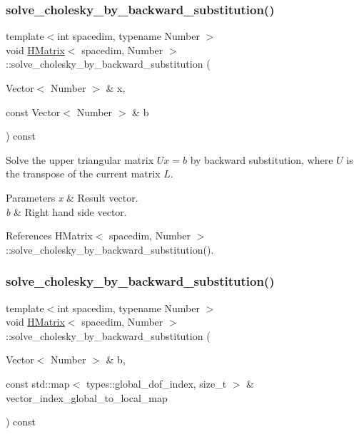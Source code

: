 \subsubsection{\texorpdfstring{solve\+\_\+cholesky\+\_\+by\+\_\+backward\+\_\+substitution()}{solve\_cholesky\_by\_backward\_substitution()}\hspace{0.1cm}{\footnotesize\ttfamily [2/4]}}
{\footnotesize\ttfamily template$<$int spacedim, typename Number $>$ \\
void \hyperlink{classHMatrix}{H\+Matrix}$<$ spacedim, Number $>$\+::solve\+\_\+cholesky\+\_\+by\+\_\+backward\+\_\+substitution (\begin{DoxyParamCaption}\item[{Vector$<$ Number $>$ \&}]{x,  }\item[{const Vector$<$ Number $>$ \&}]{b }\end{DoxyParamCaption}) const}

Solve the upper triangular matrix $Ux=b$ by backward substitution, where $U$ is the transpose of the current matrix $L$.


\begin{DoxyParams}{Parameters}
{\em x} & Result vector. \\
\hline
{\em b} & Right hand side vector. \\
\hline
\end{DoxyParams}


References H\+Matrix$<$ spacedim, Number $>$\+::solve\+\_\+cholesky\+\_\+by\+\_\+backward\+\_\+substitution().

\mbox{\label{classHMatrix_ae8bbf6f35a2099872fbcbfda2cb1abbd}} 
\subsubsection{\texorpdfstring{solve\+\_\+cholesky\+\_\+by\+\_\+backward\+\_\+substitution()}{solve\_cholesky\_by\_backward\_substitution()}\hspace{0.1cm}{\footnotesize\ttfamily [3/4]}}
{\footnotesize\ttfamily template$<$int spacedim, typename Number $>$ \\
void \hyperlink{classHMatrix}{H\+Matrix}$<$ spacedim, Number $>$\+::solve\+\_\+cholesky\+\_\+by\+\_\+backward\+\_\+substitution (\begin{DoxyParamCaption}\item[{Vector$<$ Number $>$ \&}]{b,  }\item[{const std\+::map$<$ types\+::global\+\_\+dof\+\_\+index, size\+\_\+t $>$ \&}]{vector\+\_\+index\+\_\+global\+\_\+to\+\_\+local\+\_\+map }\end{DoxyParamCaption}) const}

